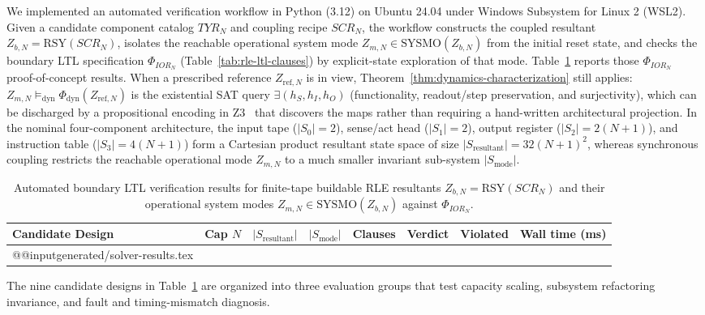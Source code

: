We implemented an automated verification workflow in Python (3.12) on Ubuntu 24.04 under Windows Subsystem for Linux 2 (WSL2). Given a candidate component catalog $TYR_N$ and coupling recipe $SCR_N$, the workflow constructs the coupled resultant $Z_{b,N}=\mathrm{RSY}(SCR_N)$, isolates the reachable operational system mode $Z_{m,N}\in\mathrm{SYSMO}(Z_{b,N})$ from the initial reset state, and checks the boundary LTL specification $\Phi_{IOR_N}$ (Table~\ref{tab:rle-ltl-clauses}) by explicit-state exploration of that mode. Table~\ref{tab:solver-results} reports those $\Phi_{IOR_N}$ proof-of-concept results. When a prescribed reference $Z_{\mathrm{ref},N}$ is in view, Theorem~\ref{thm:dynamics-characterization} still applies: $Z_{m,N}\models_{\mathrm{dyn}}\Phi_{\mathrm{dyn}}(Z_{\mathrm{ref},N})$ is the existential SAT query $\exists(h_S,h_I,h_O)$ (functionality, readout/step preservation, and surjectivity), which can be discharged by a propositional encoding in Z3~\cite{deMouraZ32008} that discovers the maps rather than requiring a hand-written architectural projection. In the nominal four-component architecture, the input tape ($|S_0|=2$), sense/act head ($|S_1|=2$), output register ($|S_2|=2(N{+}1)$), and instruction table ($|S_3|=4(N{+}1)$) form a Cartesian product resultant state space of size $|S_{\mathrm{resultant}}|=32(N{+}1)^2$, whereas synchronous coupling restricts the reachable operational mode $Z_{m,N}$ to a much smaller invariant sub-system $|S_{\mathrm{mode}}|$.

\begin{table}[t]
\caption{Automated boundary LTL verification results for finite-tape buildable RLE resultants $Z_{b,N}=\mathrm{RSY}(SCR_N)$ and their operational system modes $Z_{m,N}\in\mathrm{SYSMO}(Z_{b,N})$ against $\Phi_{IOR_N}$.}
\label{tab:solver-results}
\renewcommand{\arraystretch}{1.25}
\footnotesize
\begin{tabularx}{\textwidth}{@{}X r r r r c c r@{}}
\toprule
\textbf{Candidate Design} & \textbf{Cap $N$} & \textbf{$|S_{\mathrm{resultant}}|$} & \textbf{$|S_{\mathrm{mode}}|$} & \textbf{Clauses} & \textbf{Verdict} & \textbf{Violated} & \textbf{Wall time (ms)} \\
\midrule
\csname @@input\endcsname generated/solver-results.tex
\bottomrule
\end{tabularx}
\end{table}

The nine candidate designs in Table~\ref{tab:solver-results} are organized into three evaluation groups that test capacity scaling, subsystem refactoring invariance, and fault and timing-mismatch diagnosis.

